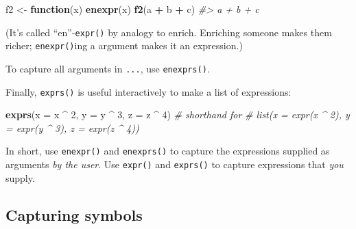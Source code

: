 \documentclass[]{book}
\newenvironment{Shaded}{\begin{snugshade}}{\end{snugshade}}
\newcommand{\CommentTok}[1]{\textcolor[rgb]{0.37,0.37,0.37}{\textit{#1}}}
\newcommand{\ControlFlowTok}[1]{\textcolor[rgb]{0.27,0.27,0.27}{\textbf{#1}}}
\newcommand{\DataTypeTok}[1]{\textcolor[rgb]{0.27,0.27,0.27}{#1}}
\newcommand{\DecValTok}[1]{\textcolor[rgb]{0.06,0.06,0.06}{#1}}
\newcommand{\KeywordTok}[1]{\textcolor[rgb]{0.27,0.27,0.27}{\textbf{#1}}}
\newcommand{\NormalTok}[1]{#1}
\newcommand{\OperatorTok}[1]{\textcolor[rgb]{0.43,0.43,0.43}{\textbf{#1}}}
\newcommand{\StringTok}[1]{\textcolor[rgb]{0.5,0.5,0.5}{#1}}
\begin{document}
\begin{Shaded}
\begin{Highlighting}[]
\NormalTok{f2 <-}\StringTok{ }\ControlFlowTok{function}\NormalTok{(x) }\KeywordTok{enexpr}\NormalTok{(x)}
\KeywordTok{f2}\NormalTok{(a }\OperatorTok{+}\StringTok{ }\NormalTok{b }\OperatorTok{+}\StringTok{ }\NormalTok{c)}
\CommentTok{#> a + b + c}
\end{Highlighting}
\end{Shaded}

(It's called ``en''-\texttt{expr()} by analogy to enrich. Enriching someone makes them richer; \texttt{enexpr()}ing a argument makes it an expression.)

To capture all arguments in \texttt{...}, use \texttt{enexprs()}.

\begin{Shaded}
\end{Shaded}

Finally, \texttt{exprs()} is useful interactively to make a list of expressions:

\begin{Shaded}
\begin{Highlighting}[]
\KeywordTok{exprs}\NormalTok{(}\DataTypeTok{x =}\NormalTok{ x }\OperatorTok{^}\StringTok{ }\DecValTok{2}\NormalTok{, }\DataTypeTok{y =}\NormalTok{ y }\OperatorTok{^}\StringTok{ }\DecValTok{3}\NormalTok{, }\DataTypeTok{z =}\NormalTok{ z }\OperatorTok{^}\StringTok{ }\DecValTok{4}\NormalTok{)}
\CommentTok{# shorthand for}
\CommentTok{# list(x = expr(x ^ 2), y = expr(y ^ 3), z = expr(z ^ 4))}
\end{Highlighting}
\end{Shaded}

In short, use \texttt{enexpr()} and \texttt{enexprs()} to capture the expressions supplied as arguments \emph{by the user}. Use \texttt{expr()} and \texttt{exprs()} to capture expressions that \emph{you} supply.

\hypertarget{capturing-symbols}{%
\subsection{Capturing symbols}\label{capturing-symbols}}
\end{document}

